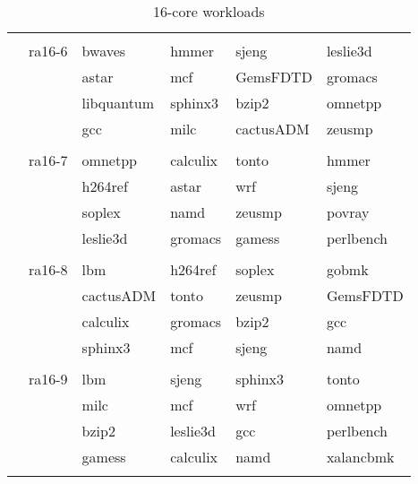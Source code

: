 \begin{table}[ht]
{\begin{tabular}{|r|r|llll|}
 & & & & &  \\ 
			 & ra16-6	 & bwaves & hmmer & sjeng & leslie3d \\ 
 & 	 & astar & mcf & GemsFDTD & gromacs \\ 
 & 	 & libquantum & sphinx3 & bzip2 & omnetpp \\ 
 & 	 & gcc & milc & cactusADM & zeusmp \\ 
 & & & & &  \\ 
			 & ra16-7	 & omnetpp & calculix & tonto & hmmer \\ 
 & 	 & h264ref & astar & wrf & sjeng \\ 
 & 	 & soplex & namd & zeusmp & povray \\ 
 & 	 & leslie3d & gromacs & gamess & perlbench \\ 
 & & & & &  \\ 
			 & ra16-8	 & lbm & h264ref & soplex & gobmk \\ 
 & 	 & cactusADM & tonto & zeusmp & GemsFDTD \\ 
 & 	 & calculix & gromacs & bzip2 & gcc \\ 
 & 	 & sphinx3 & mcf & sjeng & namd \\ 
 & & & & &  \\ 
			 & ra16-9	 & lbm & sjeng & sphinx3 & tonto \\ 
 & 	 & milc & mcf & wrf & omnetpp \\ 
 & 	 & bzip2 & leslie3d & gcc & perlbench \\ 
 & 	 & gamess & calculix & namd & xalancbmk \\ 
 & & & & &  \\ 
\hline
\end{tabular}%
} 
\caption{16-core workloads}
\label{tbl:benchmark_workloads:16-workloads}
\end{table}
